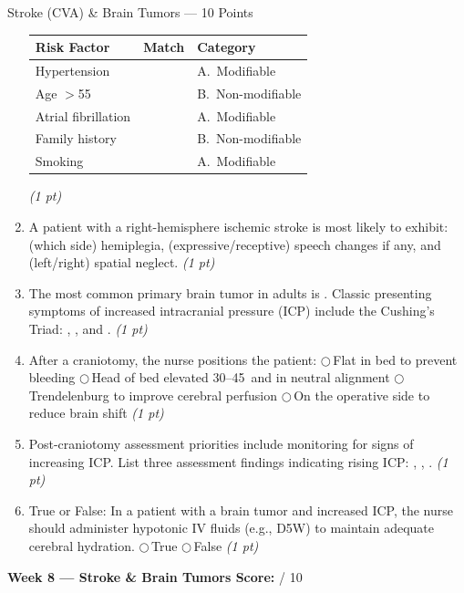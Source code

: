 \documentclass[11pt,letterpaper]{article}
\newcommand{\blank}[1][3cm]{\underline{\hspace{#1}}}
\begin{document}
\begin{diagbox}{Stroke (CVA) \& Brain Tumors --- 10 Points}
\begin{enumerate}[leftmargin=1.5em, label=\textbf{\arabic*.},start=71]
  \vspace{0.2cm}
  \begin{center}
  \renewcommand{\arraystretch}{1.6}
  \begin{tabular}{|p{4cm}|p{1.5cm}|p{5cm}|}
  \hline
  \textbf{Risk Factor} & \textbf{Match} & \textbf{Category} \\
  \hline
  Hypertension         & \blank[1.2cm] & A.\ Modifiable \\
  \hline
  Age $>$55            & \blank[1.2cm] & B.\ Non-modifiable \\
  \hline
  Atrial fibrillation  & \blank[1.2cm] & A.\ Modifiable \\
  \hline
  Family history       & \blank[1.2cm] & B.\ Non-modifiable \\
  \hline
  Smoking              & \blank[1.2cm] & A.\ Modifiable \\
  \hline
  \end{tabular}
  \end{center}
  \hfill\textit{(1 pt)}

  \item A patient with a right-hemisphere ischemic stroke is most likely to
        exhibit: \blank[4cm] (which side) hemiplegia, \blank[3cm]
        (expressive/receptive) speech changes if any, and
        \blank[4cm] (left/right) spatial neglect.
        \hfill\textit{(1 pt)}

  \item The most common primary brain tumor in adults is \blank[4cm].
        Classic presenting symptoms of increased intracranial pressure (ICP) include
        the Cushing's Triad: \blank[3cm], \blank[3cm],
        and \blank[3cm].
        \hfill\textit{(1 pt)}

  \item After a craniotomy, the nurse positions the patient:
        $\bigcirc$\,Flat in bed to prevent bleeding
        $\bigcirc$\,Head of bed elevated 30--45\textdegree\ and in neutral alignment
        $\bigcirc$\,Trendelenburg to improve cerebral perfusion
        $\bigcirc$\,On the operative side to reduce brain shift
        \hfill\textit{(1 pt)}

  \item Post-craniotomy assessment priorities include monitoring for signs of
        increasing ICP.  List three assessment findings indicating rising ICP:
        \blank[3.5cm], \blank[3.5cm], \blank[3.5cm].
        \hfill\textit{(1 pt)}

  \item True or False: In a patient with a brain tumor and increased ICP,
        the nurse should administer hypotonic IV fluids (e.g., D5W) to maintain
        adequate cerebral hydration.
        \quad$\bigcirc$\,True \quad$\bigcirc$\,False
        \hfill\textit{(1 pt)}

\end{enumerate}

\vspace{0.3cm}
\textbf{Week 8 --- Stroke \& Brain Tumors Score:} \blank[1cm] / 10
\end{diagbox}
\end{document}
